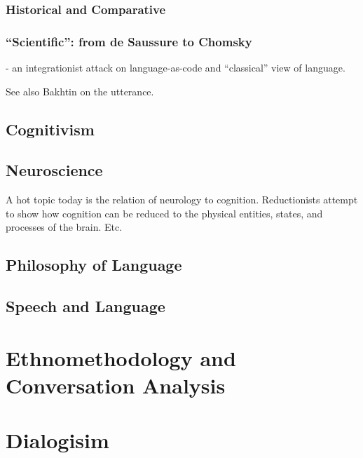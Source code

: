 \documentclass[11pt,twoside]{article}
\begin{document}
\subsubsection{Historical and Comparative}

\subsubsection{``Scientific'': from de Saussure to Chomsky}

\cite{love_cognition_2004} - an integrationist attack on
language-as-code and ``classical'' view of language.

See also Bakhtin on the utterance.

\subsection{Cognitivism}

\cite{levinson_cognition_2006}

\subsection{Neuroscience}

A hot topic today is the relation of neurology to cognition.
Reductionists attempt to show how cognition can be reduced to the
physical entities, states, and processes of the brain.  Etc.

\subsection{Philosophy of Language}

\subsection{Speech and Language}

\section{Ethnomethodology and Conversation Analysis}

\begin{abstract}

\end{abstract}

\section{Dialogisim}
\end{document}
